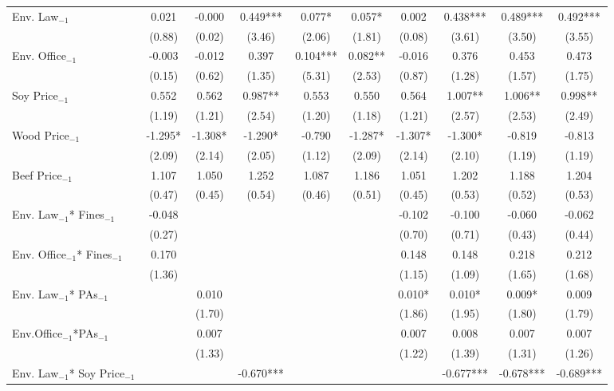 \begin{landscape}
\begin{table}[htp!]
\begin{tabularx}{0.82\linewidth}{l C C C C C C C C C}
    Env. Law$_{-1}$ & 0.021	&	-0.000	&	0.449***	&	0.077*	&	0.057*	&	0.002	&	0.438***	&	0.489***	&	0.492***	\\
                    & 		(0.88)	&	(0.02)	&	(3.46)	&	(2.06)	&	(1.81)	&	(0.08)	&	(3.61)	&	(3.50)	&	(3.55)	\\
    Env. Office$_{-1}$ & -0.003	&	-0.012	&	0.397	&	0.104***	&	0.082**	&	-0.016	&	0.376	&	0.453	&	0.473	\\
                    &	(0.15)	&	(0.62)	&	(1.35)	&	(5.31)	&	(2.53)	&	(0.87)	&	(1.28)	&	(1.57)	&	(1.75)	\\
    Soy Price$_{-1}$& 0.552	&	0.562	&	0.987**	&	0.553	&	0.550	&	0.564	&	1.007**	&	1.006**	&	0.998**	\\
                    & 		(1.19)	&	(1.21)	&	(2.54)	&	(1.20)	&	(1.18)	&	(1.21)	&	(2.57)	&	(2.53)	&	(2.49)	\\
    Wood Price$_{-1}$& 	-1.295*	&	-1.308*	&	-1.290*	&	-0.790	&	-1.287*	&	-1.307*	&	-1.300*	&	-0.819	&	-0.813	\\
                    & 		(2.09)	&	(2.14)	&	(2.05)	&	(1.12)	&	(2.09)	&	(2.14)	&	(2.10)	&	(1.19)	&	(1.19)	\\
    Beef Price$_{-1}$& 	1.107	&	1.050	&	1.252	&	1.087	&	1.186	&	1.051	&	1.202	&	1.188	&	1.204	\\
                    & 	(0.47)	&	(0.45)	&	(0.54)	&	(0.46)	&	(0.51)	&	(0.45)	&	(0.53)	&	(0.52)	&	(0.53)	\\
    Env. Law$_{-1}$* Fines$_{-1}$& 	-0.048	&		&		&		&		&	-0.102	&	-0.100	&	-0.060	&	-0.062	\\
                    & 		(0.27)	&		&		&		&		&	(0.70)	&	(0.71)	&	(0.43)	&	(0.44)	\\
    Env. Office$_{-1}$* Fines$_{-1}$& 	0.170	&		&		&		&		&	0.148	&	0.148	&	0.218	&	0.212	\\
                    & 		(1.36)	&		&		&		&		&	(1.15)	&	(1.09)	&	(1.65)	&	(1.68)	\\
    Env. Law$_{-1}$* PAs$_{-1}$ & 		&	0.010	&		&		&		&	0.010*	&	0.010*	&	0.009*	&	0.009	\\
                    &				&	(1.70)	&		&		&		&	(1.86)	&	(1.95)	&	(1.80)	&	(1.79)	\\
    Env.Office$_{-1}$*PAs$_{-1}$  & 	&	0.007	&		&		&		&	0.007	&	0.008	&	0.007	&	0.007	\\
                    &  				&	(1.33)	&		&		&		&	(1.22)	&	(1.39)	&	(1.31)	&	(1.26)	\\
    Env. Law$_{-1}$* Soy Price$_{-1}$& 		&		&	-0.670***	&		&		&		&	-0.677***	&	-0.678***	&	-0.689***	\\

\end{tabularx}
\end{table}
\end{landscape}

